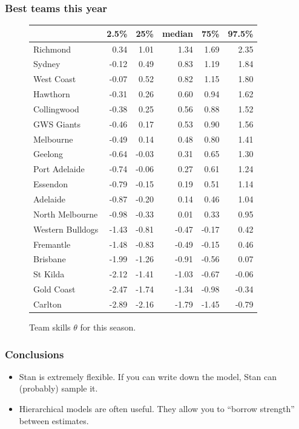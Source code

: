 \documentclass{beamer}
\begin{document}
\begin{frame}
	\frametitle{Best teams this year}
	\begin{figure}
	\tiny
	\begin{tabular}{lrrrrr}
\toprule
{} &  2.5\% &   25\% &  median &   75\% &  97.5\% \\
\midrule
Richmond         &  0.34 &  1.01 &    1.34 &  1.69 &   2.35 \\
Sydney           & -0.12 &  0.49 &    0.83 &  1.19 &   1.84 \\
West Coast       & -0.07 &  0.52 &    0.82 &  1.15 &   1.80 \\
Hawthorn         & -0.31 &  0.26 &    0.60 &  0.94 &   1.62 \\
Collingwood      & -0.38 &  0.25 &    0.56 &  0.88 &   1.52 \\
GWS Giants       & -0.46 &  0.17 &    0.53 &  0.90 &   1.56 \\
Melbourne        & -0.49 &  0.14 &    0.48 &  0.80 &   1.41 \\
Geelong          & -0.64 & -0.03 &    0.31 &  0.65 &   1.30 \\
Port Adelaide    & -0.74 & -0.06 &    0.27 &  0.61 &   1.24 \\
Essendon         & -0.79 & -0.15 &    0.19 &  0.51 &   1.14 \\
Adelaide         & -0.87 & -0.20 &    0.14 &  0.46 &   1.04 \\
North Melbourne  & -0.98 & -0.33 &    0.01 &  0.33 &   0.95 \\
Western Bulldogs & -1.43 & -0.81 &   -0.47 & -0.17 &   0.42 \\
Fremantle        & -1.48 & -0.83 &   -0.49 & -0.15 &   0.46 \\
Brisbane         & -1.99 & -1.26 &   -0.91 & -0.56 &   0.07 \\
St Kilda         & -2.12 & -1.41 &   -1.03 & -0.67 &  -0.06 \\
Gold Coast       & -2.47 & -1.74 &   -1.34 & -0.98 &  -0.34 \\
Carlton          & -2.89 & -2.16 &   -1.79 & -1.45 &  -0.79 \\
\bottomrule
\end{tabular}	
\caption{Team skills $\theta$ for this season.}
\end{figure}
\end{frame}

\begin{frame}
\frametitle{Conclusions}
\begin{itemize}
	\item Stan is extremely flexible. If you can write down the model, Stan can (probably) sample it.
	\item Hierarchical models are often useful. They allow you to ``borrow strength'' between estimates.
\end{itemize}
\end{frame}
\end{document}
